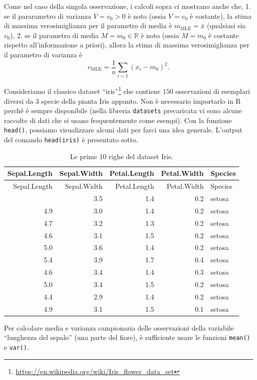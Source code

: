 \documentclass[
  italian,
  letterpaper,
]{book}
\newcommand{\R}{\mathbb{R}}
\newcommand{\mle}{\operatorname{MLE}}
\theoremstyle{definition}
\theoremstyle{remark}
\begin{document}
Come nel caso della singola osservazione, i calcoli sopra ci mostrano
anche che, 1. se il pararametro di varianza \(V=v_0 >0\) è noto (ossia
\(V=v_0\) è costante), la stima di massima verosimiglianza per il
parametro di media è \(m_{{\mle}}  = \bar{x}\) (qualsiasi sia \(v_0\)),
2. se il parametro di media \(M=m_0\in \R\) è noto (ossia \(M=m_0\) è
costante rispetto all'informazione a priori), allora la stima di massima
verosimiglianza per il parametro di varianza è
\[ v_{{\mle}} = \frac 1 n \sum_{i=1}(x_i-m_0)^2.\]

Consideriamo il classico dataset ``iris''\footnote{\url{https://en.wikipedia.org/wiki/Iris_flower_data_set}}
che contiene \(150\) osservazioni di esemplari diversi da \(3\) specie
della pianta Iris appunto. Non è necessario importarlo in R perché è
sempre disponibile (nella libreria \texttt{datasets} precaricata vi sono
alcune raccolte di dati che si usano frequentemente come esempi). Con la
funzione \texttt{head()}, possiamo visualizzare alcuni dati per farci
una idea generale. L'output del comando \texttt{head(iris)} è presentato
sotto.

\begin{longtable}[]{@{}rrrrl@{}}
\caption{Le prime 10 righe del dataset Iris.}\tabularnewline
\toprule\noalign{}
Sepal.Length & Sepal.Width & Petal.Length & Petal.Width & Species \\
\midrule\noalign{}
\endfirsthead
\toprule\noalign{}
Sepal.Length & Sepal.Width & Petal.Length & Petal.Width & Species \\
\midrule\noalign{}
\endhead
\bottomrule\noalign{}
\endlastfoot
5.1 & 3.5 & 1.4 & 0.2 & setosa \\
4.9 & 3.0 & 1.4 & 0.2 & setosa \\
4.7 & 3.2 & 1.3 & 0.2 & setosa \\
4.6 & 3.1 & 1.5 & 0.2 & setosa \\
5.0 & 3.6 & 1.4 & 0.2 & setosa \\
5.4 & 3.9 & 1.7 & 0.4 & setosa \\
4.6 & 3.4 & 1.4 & 0.3 & setosa \\
5.0 & 3.4 & 1.5 & 0.2 & setosa \\
4.4 & 2.9 & 1.4 & 0.2 & setosa \\
4.9 & 3.1 & 1.5 & 0.1 & setosa \\
\end{longtable}

Per calcolare media e varianza campionaria delle osservazioni della
variabile ``lunghezza del sepalo'' (una parte del fiore), è sufficiente
usare le funzioni \texttt{mean()} e \texttt{var()}.
\end{document}

